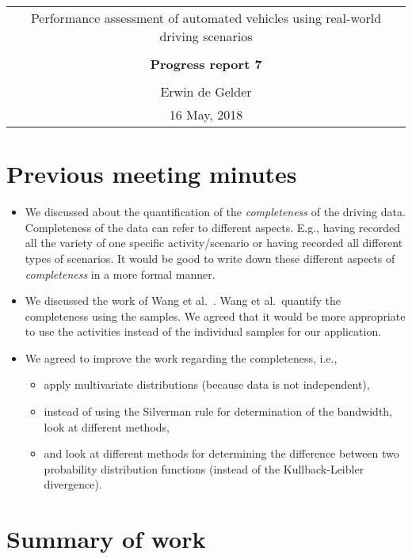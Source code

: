 \documentclass[10pt,final,a4paper,oneside,onecolumn]{article}
\newcommand{\progressreportnumber}{7}
\renewcommand{\author}{Erwin de Gelder}
\renewcommand{\date}{16 May, 2018}
\renewcommand{\title}{Performance assessment of automated vehicles using real-world driving scenarios}
\begin{document}
	
\begin{center}
	\begin{tabular}{c}
		\title \\ \\
		\textbf{\huge Progress report \progressreportnumber} \\ \\
		\author \\ 
		\date
	\end{tabular}
\end{center}

\section{Previous meeting minutes}

\begin{itemize}
	\item We discussed about the quantification of the \emph{completeness} of the driving data. Completeness of the data can refer to different aspects. E.g., having recorded all the variety of one specific activity/scenario or having recorded all different types of scenarios. It would be good to write down these different aspects of \emph{completeness} in a more formal manner. 
	\item We discussed the work of Wang et al.\ \cite{wang2017much}. Wang et al.\ quantify the completeness using the samples. We agreed that it would be more appropriate to use the activities instead of the individual samples for our application.
	\item We agreed to improve the work regarding the completeness, i.e., 
	\begin{itemize}
		\item apply multivariate distributions (because data is not independent),
		\item instead of using the Silverman rule for determination of the bandwidth, look at different methods,
		\item and look at different methods for determining the difference between two probability distribution functions (instead of the Kullback-Leibler divergence).
	\end{itemize}
\end{itemize}

\section{Summary of work}
\end{document}
